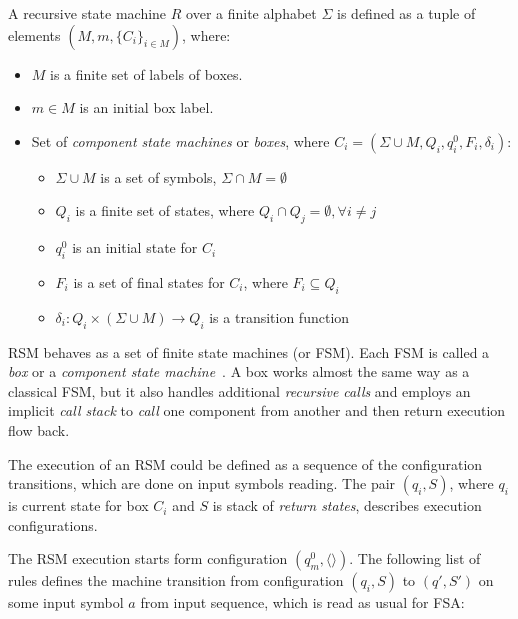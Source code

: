 \begin{definition}
A recursive state machine $R$ over a finite alphabet $\Sigma$ is defined as a tuple of elements $(M,m,\{C_i\}_{i \in M})$, where:

\begin{itemize}
    \item $M$ is a finite set of labels of boxes.
    \item $m \in M$ is an initial box label.
    \item Set of \textit{component state machines} or \textit{boxes},
          where $C_i=(\Sigma \cup M, Q_i,q_i^0,F_i,\delta_i)$:
    \begin{itemize}
        \item $\Sigma \cup M$ is a set of symbols, $\Sigma \cap M = \emptyset$
        \item $Q_i$ is a finite set of states,
              where $Q_i \cap Q_j = \emptyset, \forall i \neq j$
        \item $q_i^0$ is an initial state for $C_i$
        \item $F_i$ is a set of final states for $C_i$, where $F_i \subseteq Q_i$
        \item $\delta_i: Q_i \times (\Sigma \cup M) \to Q_i$ is a transition function %
    \end{itemize}
\end{itemize}

\end{definition}

RSM behaves as a set of finite state machines (or FSM).
Each FSM is called a \textit{box} or a \textit{component state machine}~\cite{rsm:analysis:10.1007/3-540-44585-4_18}.
A box works almost the same way as a classical FSM, but it also handles additional \textit{recursive calls} and employs an implicit \textit{call stack} to \textit{call} one component from another and then return execution flow back.

The execution of an RSM could be defined as a sequence of the configuration transitions, which are done on input symbols reading. 
The pair $(q_i,S)$, where $q_i$ is current state for box $C_i$ and $S$ is stack of \textit{return states}, describes execution configurations. 

The RSM execution starts form configuration $(q_m^0, \langle\rangle)$. 
The following list of rules defines the machine transition from configuration $(q_i,S)$ to $(q',S')$ on some input symbol $a$ from input sequence, which is read as usual for FSA:

